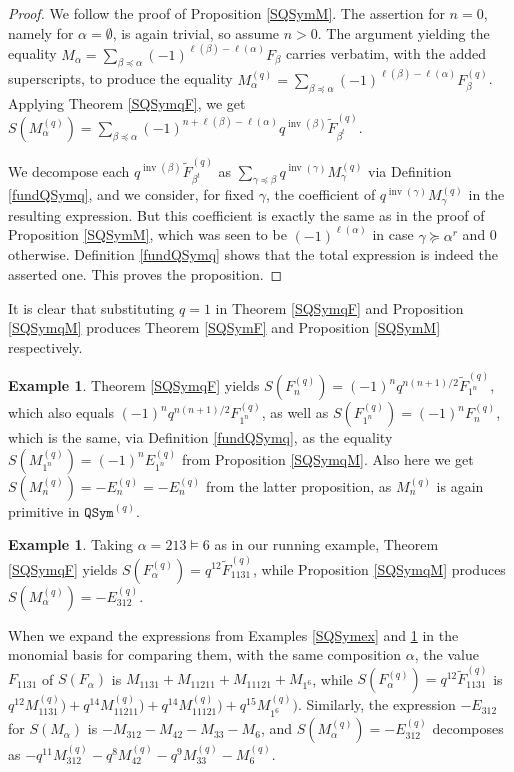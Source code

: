 \documentclass{article}
\theoremstyle{definition}
\newtheorem{ex}[thm]{Example}
\begin{document}
\begin{proof}
We follow the proof of Proposition \ref{SQSymM}. The assertion for $n=0$, namely for $\alpha=\emptyset$, is again trivial, so assume $n>0$. The argument yielding the equality $M_{\alpha}=\sum_{\beta\preceq\alpha}(-1)^{\ell(\beta)-\ell(\alpha)}F_{\beta}$ carries verbatim, with the added superscripts, to produce the equality $M_{\alpha}^{(q)}=\sum_{\beta\preceq\alpha}(-1)^{\ell(\beta)-\ell(\alpha)}F_{\beta}^{(q)}$. Applying Theorem \ref{SQSymqF}, we get $S(M_{\alpha}^{(q)})=\sum_{\beta\preceq\alpha}(-1)^{n+\ell(\beta)-\ell(\alpha)}q^{\operatorname{inv}(\beta)}\widetilde{F}_{\beta^{t}}^{(q)}$.

We decompose each $q^{\operatorname{inv}(\beta)}\widetilde{F}_{\beta^{t}}^{(q)}$ as $\sum_{\gamma\preceq\beta}q^{\operatorname{inv}(\gamma)}M_{\gamma}^{(q)}$ via Definition \ref{fundQSymq}, and we consider, for fixed $\gamma$, the coefficient of $q^{\operatorname{inv}(\gamma)}M_{\gamma}^{(q)}$ in the resulting expression. But this coefficient is exactly the same as in the proof of Proposition \ref{SQSymM}, which was seen to be $(-1)^{\ell(\alpha)}$ in case $\gamma\succeq\alpha^{r}$ and 0 otherwise. Definition \ref{fundQSymq} shows that the total expression is indeed the asserted one. This proves the proposition.
\end{proof}
It is clear that substituting $q=1$ in Theorem \ref{SQSymqF} and Proposition \ref{SQSymqM} produces Theorem \ref{SQSymF} and Proposition \ref{SQSymM} respectively.
\begin{ex}
Theorem \ref{SQSymqF} yields $S(F_{n}^{(q)})=(-1)^{n}q^{n(n+1)/2}\widetilde{F}_{1^{n}}^{(q)}$, which also equals $(-1)^{n}q^{n(n+1)/2}F_{1^{n}}^{(q)}$, as well as $S(F_{1^{n}}^{(q)})=(-1)^{n}F_{n}^{(q)}$, which is the same, via Definition \ref{fundQSymq}, as the equality $S(M_{1^{n}}^{(q)})=(-1)^{n}E_{1^{n}}^{(q)}$ from Proposition \ref{SQSymqM}. Also here we get $S(M_{n}^{(q)})=-E_{n}^{(q)}=-E_{n}^{(q)}$ from the latter proposition, as $M_{n}^{(q)}$ is again primitive in $\mathtt{QSym}^{(q)}$. \label{SQSymqext}
\end{ex}

\begin{ex}
Taking $\alpha=213\vDash6$ as in our running example, Theorem \ref{SQSymqF} yields $S(F_{\alpha}^{(q)})=q^{12}\widetilde{F}_{1131}^{(q)}$, while Proposition \ref{SQSymqM} produces $S(M_{\alpha}^{(q)})=-E_{312}^{(q)}$. \label{antQSymqex}
\end{ex}
When we expand the expressions from Examples \ref{SQSymex} and \ref{antQSymqex} in the monomial basis for comparing them, with the same composition $\alpha$, the value $F_{1131}$ of $S(F_{\alpha})$ is $M_{1131}+M_{11211}+M_{11121}+M_{1^{6}}$, while $S(F_{\alpha}^{(q)})=q^{12}\widetilde{F}_{1131}^{(q)}$ is $q^{12}M_{1131}^{(q)})+q^{14}M_{11211}^{(q)})+q^{14}M_{11121}^{(q)})+q^{15}M_{1^{6}}^{(q)})$. Similarly, the expression $-E_{312}$ for $S(M_{\alpha})$ is $-M_{312}-M_{42}-M_{33}-M_{6}$, and $S(M_{\alpha}^{(q)})=-E_{312}^{(q)}$ decomposes as $-q^{11}M_{312}^{(q)}-q^{8}M_{42}^{(q)}-q^{9}M_{33}^{(q)}-M_{6}^{(q)}$.
\end{document}

